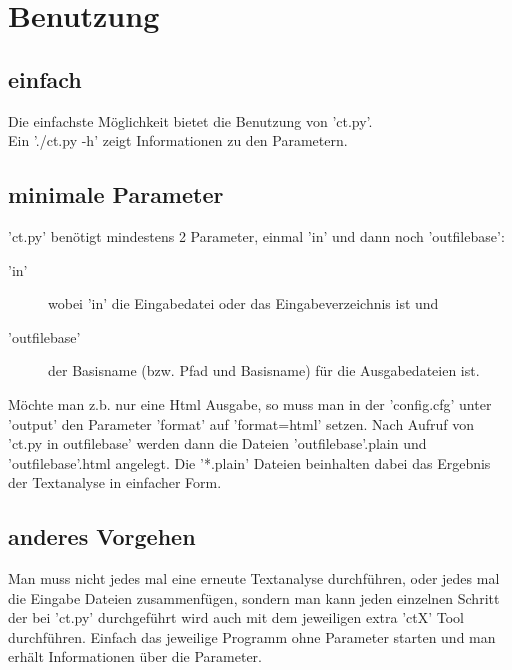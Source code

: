 \section{Benutzung}
\subsection{einfach}
Die einfachste Möglichkeit bietet die Benutzung von 'ct.py'.
\\
Ein './ct.py -h' zeigt Informationen zu den Parametern.
\subsection*{minimale Parameter}
'ct.py' benötigt mindestens 2 Parameter, einmal 'in' und dann noch 'outfilebase':
\begin{description}
      \item['in'] wobei 'in' die Eingabedatei oder das Eingabeverzeichnis ist und
      \item['outfilebase']der Basisname (bzw. Pfad und Basisname) für die Ausgabedateien ist.
\end{description}
Möchte man z.b. nur eine Html Ausgabe, so muss man in der 'config.cfg'
unter 'output' den Parameter 'format' auf 'format=html' setzen. 
Nach Aufruf von 'ct.py in outfilebase' werden dann die Dateien 'outfilebase'.plain und 'outfilebase'.html angelegt.
Die '*.plain' Dateien beinhalten dabei das Ergebnis der Textanalyse in einfacher Form. 

\subsection{anderes Vorgehen}
Man muss nicht jedes mal eine erneute Textanalyse durchführen, oder jedes mal die Eingabe Dateien zusammenfügen,
sondern man kann jeden einzelnen Schritt der bei 'ct.py' durchgeführt wird auch mit dem jeweiligen extra 'ctX' Tool durchführen.
Einfach das jeweilige Programm ohne Parameter starten und man erhält Informationen über die Parameter.

\clearpage
